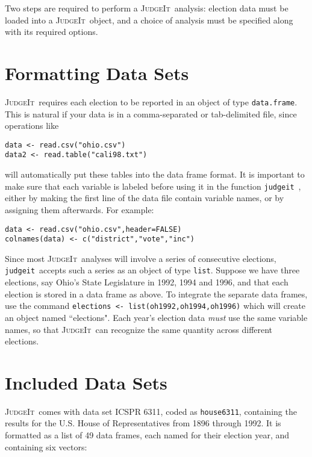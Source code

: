\documentclass[oneside,letterpaper,titlepage]{article}
\newcommand{\JudgeIt}{\textsc{JudgeIt}\ }
\newcommand{\jud}{\texttt{judgeit}\ }
\begin{document}
Two steps are required to perform a \JudgeIt analysis: election data must be loaded into a \JudgeIt object, and a choice of analysis must be specified along with its required options.

\section{Formatting Data Sets}

\JudgeIt requires each election to be reported in an object of type \texttt{data.frame}.  This is natural if your data is in a comma-separated or tab-delimited file, since operations like

\begin{verbatim}
data <- read.csv("ohio.csv")
data2 <- read.table("cali98.txt")
\end{verbatim}

will automatically put these tables into the data frame format. It is important to make sure that each variable is labeled before using it in the function \jud, either by making the first line of the data file contain variable names, or by assigning them afterwards. For example:

\begin{verbatim}
data <- read.csv("ohio.csv",header=FALSE)
colnames(data) <- c("district","vote","inc")
\end{verbatim}

Since most \JudgeIt analyses will involve a series of consecutive elections, \jud accepts such a series as an object of type \texttt{list}. Suppose we have three elections, say Ohio's State Legislature in 1992, 1994 and 1996, and that each election is stored in a data frame as above. To integrate the separate data frames, use the command \texttt{elections <- list(oh1992,oh1994,oh1996)} which will create an object named ``elections". Each year's election data \emph{must} use the same variable names, so that \JudgeIt can recognize the same quantity across different elections.

\section{Included Data Sets}

\JudgeIt comes with data set ICSPR 6311, coded as \texttt{house6311}, containing the results for the U.S. House of Representatives from 1896 through 1992. It is formatted as a list of 49 data frames, each named for their election year, and containing six vectors:
\end{document}
